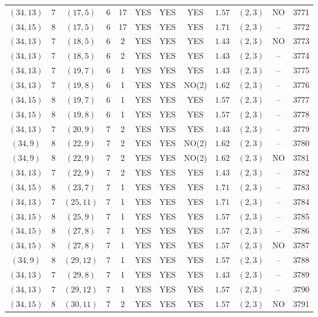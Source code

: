 \begin{longtable}{|c|c|c|c|c|c|c|c|c|c|c|c|}
$(34,13)$ & 7 & $(17,5)$ & 6 & 17 & YES & YES & YES & $1.57$ & $(2,3)$ & NO & 3771\\
$(34,15)$ & 8 & $(17,5)$ & 6 & 17 & YES & YES & YES & $1.71$ & $(2,3)$ & -- & 3772\\
$(34,13)$ & 7 & $(18,5)$ & 6 & 2 & YES & YES & YES & $1.43$ & $(2,3)$ & NO & 3773\\
$(34,13)$ & 7 & $(18,5)$ & 6 & 2 & YES & YES & YES & $1.43$ & $(2,3)$ & -- & 3774\\
$(34,13)$ & 7 & $(19,7)$ & 6 & 1 & YES & YES & YES & $1.43$ & $(2,3)$ & -- & 3775\\
$(34,13)$ & 7 & $(19,8)$ & 6 & 1 & YES & YES & NO(2) & $1.62$ & $(2,3)$ & -- & 3776\\
$(34,15)$ & 8 & $(19,7)$ & 6 & 1 & YES & YES & YES & $1.57$ & $(2,3)$ & -- & 3777\\
$(34,15)$ & 8 & $(19,8)$ & 6 & 1 & YES & YES & YES & $1.57$ & $(2,3)$ & -- & 3778\\
$(34,13)$ & 7 & $(20,9)$ & 7 & 2 & YES & YES & YES & $1.43$ & $(2,3)$ & -- & 3779\\
$(34,9)$ & 8 & $(22,9)$ & 7 & 2 & YES & YES & NO(2) & $1.62$ & $(2,3)$ & -- & 3780\\
$(34,9)$ & 8 & $(22,9)$ & 7 & 2 & YES & YES & NO(2) & $1.62$ & $(2,3)$ & NO & 3781\\
$(34,13)$ & 7 & $(22,9)$ & 7 & 2 & YES & YES & YES & $1.43$ & $(2,3)$ & -- & 3782\\
$(34,15)$ & 8 & $(23,7)$ & 7 & 1 & YES & YES & YES & $1.71$ & $(2,3)$ & -- & 3783\\
$(34,13)$ & 7 & $(25,11)$ & 7 & 1 & YES & YES & YES & $1.71$ & $(2,3)$ & -- & 3784\\
$(34,15)$ & 8 & $(25,9)$ & 7 & 1 & YES & YES & YES & $1.57$ & $(2,3)$ & -- & 3785\\
$(34,15)$ & 8 & $(27,8)$ & 7 & 1 & YES & YES & YES & $1.57$ & $(2,3)$ & -- & 3786\\
$(34,15)$ & 8 & $(27,8)$ & 7 & 1 & YES & YES & YES & $1.57$ & $(2,3)$ & NO & 3787\\
$(34,9)$ & 8 & $(29,12)$ & 7 & 1 & YES & YES & YES & $1.57$ & $(2,3)$ & -- & 3788\\
$(34,13)$ & 7 & $(29,8)$ & 7 & 1 & YES & YES & YES & $1.43$ & $(2,3)$ & -- & 3789\\
$(34,13)$ & 7 & $(29,12)$ & 7 & 1 & YES & YES & YES & $1.57$ & $(2,3)$ & -- & 3790\\
$(34,15)$ & 8 & $(30,11)$ & 7 & 2 & YES & YES & YES & $1.57$ & $(2,3)$ & NO & 3791\\

\end{longtable}
